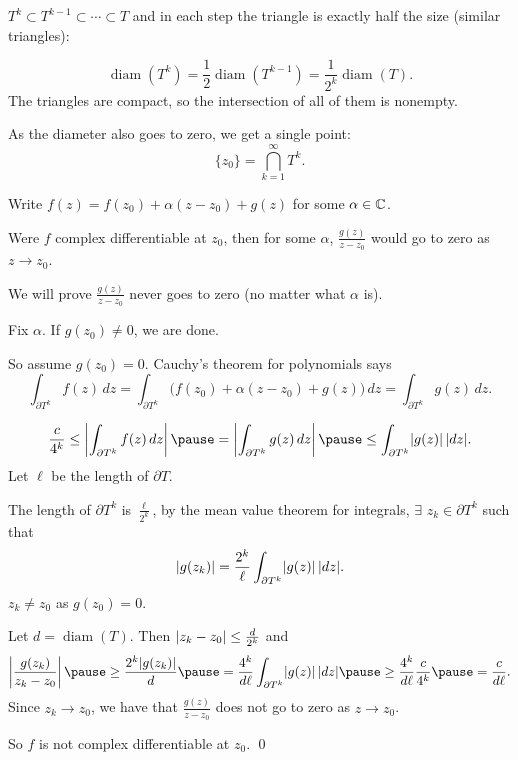 \documentclass[10pt,aspectratio=169]{beamer}
\begin{document}
\begin{frame}
$T^k \subset T^{k-1} \subset \cdots \subset T$
and in each step the triangle is exactly half the size (similar triangles):

\pause
\[
\operatorname{diam}(T^k) =
\frac{1}{2} \operatorname{diam}(T^{k-1})
=
\frac{1}{2^k} \operatorname{diam}(T) .
\]
\pause
The triangles are compact, so the intersection of all of them is
nonempty.

\pause
As the diameter also goes to zero, we get a single point:
\[
\{ z_0 \} = \bigcap_{k=1}^\infty T^k .
\]
\pause

Write
$f(z) = f(z_0) + \alpha (z-z_0) + g(z)$ for some $\alpha \in {\mathbb{C}}$.

\medskip
\pause

Were $f$ complex differentiable at $z_0$, then for some $\alpha$,
$\frac{g(z)}{z-z_0}$ would go to zero as $z \to z_0$.

\medskip
\pause

We will prove
$\frac{g(z)}{z-z_0}$ never goes to zero (no matter what $\alpha$ is).

\medskip
\pause

Fix $\alpha$.  \pause  If $g(z_0) \not= 0$, we are done.

\medskip
\pause

So assume $g(z_0) = 0$.  \pause
Cauchy's theorem for polynomials says
\[
\int_{\partial T^k} f(z) \, dz =
\int_{\partial T^k} \bigl( f(z_0) + \alpha (z-z_0) + g(z) \bigr) \, dz =
\int_{\partial T^k} g(z) \, dz .
\]
\end{frame}

\begin{frame}
\[
\frac{c}{4^k} \leq
\abs{
\int_{\partial T^k} f(z) \, dz
}
\pause
=
\abs{
\int_{\partial T^k} g(z) \, dz 
}
\pause
\leq
\int_{\partial T^k} \sabs{g(z)} \, \sabs{dz} .
\]
\pause
Let $\ell$ be the length of $\partial T$.

\medskip
\pause

The length of $\partial T^k$ is $\frac{\ell}{2^k}$,
\pause
by the mean value theorem for integrals,
$\exists$ $z_k \in \partial T^k$ such that
\[
\lvert {g(z_k)} \rvert = 
\frac{2^k}{\ell}
\int_{\partial T^k} \lvert {g(z)} \rvert \, \lvert {dz} \rvert .
\]
\pause
$z_k \not= z_0$ as $g(z_0)=0$.

\medskip
\pause

Let $d = \operatorname{diam}(T)$.  Then
$\lvert {z_k-z_0} \rvert \leq \frac{d}{2^k}$ and
\pause
\[
\abs{\frac{g(z_k)}{z_k-z_0}}
\pause
\geq
\frac{2^k\sabs{g(z_k)}}{d}
\pause
=
\frac{4^k}{d \ell}
\int_{\partial T^k} \sabs{g(z)} \, \sabs{dz}
\pause
\geq
\frac{4^k}{d \ell}
\frac{c}{4^k}
\pause
= \frac{c}{d \ell} .
\]
\pause
Since $z_k \to z_0$, we have that $\frac{g(z)}{z-z_0}$ does not 
go to zero as $z \to z_0$.
\pause
\medskip

So $f$ is not complex differentiable at $z_0$.
\qed
\end{frame}
\end{document}
